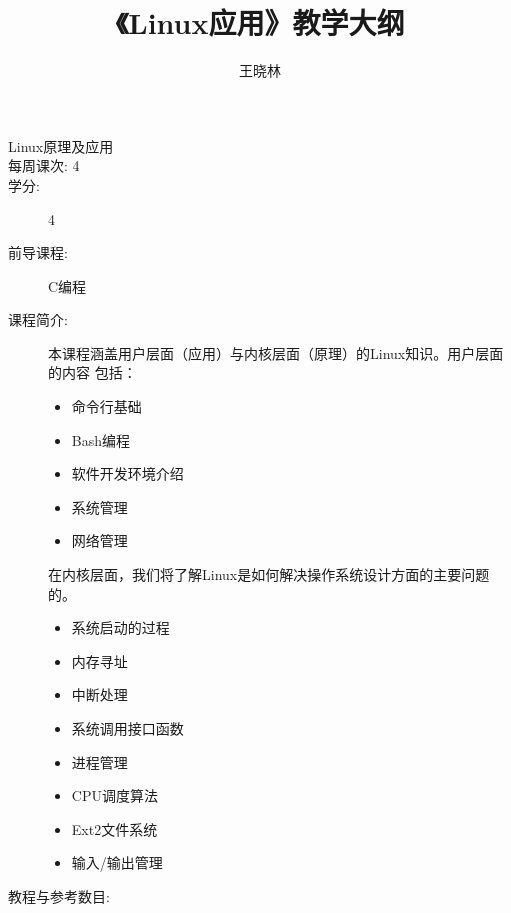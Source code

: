 \documentclass{wx672ctexart}
\title{《Linux应用》教学大纲}
\author{王晓林}
\begin{document}
\maketitle

\begin{description}
\item[Linux原理及应用]
\item[每周课次: 4]
\item[学分:] 4
\item[前导课程:] C编程
\item[课程简介:] 本课程涵盖用户层面（应用）与内核层面（原理）的Linux知识。用户层面的内容
  包括：
  \begin{itemize}
  \item 命令行基础
  \item Bash编程
  \item 软件开发环境介绍
  \item 系统管理
  \item 网络管理
  \end{itemize}
  在内核层面，我们将了解Linux是如何解决操作系统设计方面的主要问题的。
  \begin{multicols}{2}
    \begin{itemize}
    \item 系统启动的过程
    \item 内存寻址
    \item 中断处理
    \item 系统调用接口函数
    \item 进程管理
    \item CPU调度算法
    \item Ext2文件系统
    \item 输入/输出管理
    \end{itemize}
  \end{multicols}
  \item[教程与参考数目:]\hfill
  \nocite{cooper10bash,web:debianhandbook,web:debkernelhandbook,bovet2005understanding,tanenbaum2008modern,bovet2005understanding}
  \printbibliography[heading=none]{}
\end{description}
\end{document}
